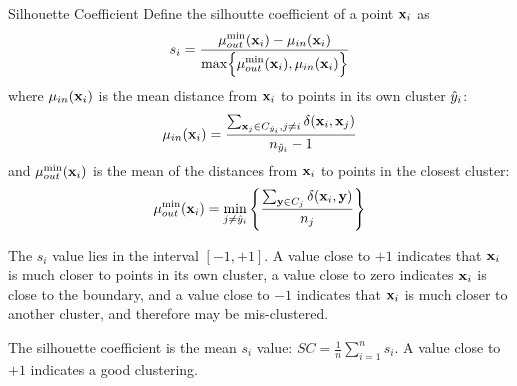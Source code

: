 \begin{frame}{Silhouette Coefficient}
  \small
Define the
silhoutte coeff\/{i}cient of a point $\mathbf{x}_i$ as
\begin{align*}
  s_i = \frac{\displaystyle \mu_{out}^{\min}(\mathbf{x}_i)-\mu_{in}(\mathbf{x}_i)}
  {\displaystyle \max
  \Bigl\{\mu_{out}^{\min}(\mathbf{x}_i), \mu_{in}(\mathbf{x}_i)\Bigr\} }
\end{align*}
where
$\mu_{in}(\mathbf{x}_i)$ is the mean distance from $\mathbf{x}_i$ to points in its own cluster $\hat{y}_i$:
\begin{align*}
  \mu_{in}(\mathbf{x}_i) = \frac{\sum_{\mathbf{x}_{j} \in C_{\hat{y}_i}, j \ne i}
  \delta(\mathbf{x}_i,\mathbf{x}_{j})}{n_{\hat{y}_i}-1}
\end{align*}
and $\mu_{out}^{\min}(\mathbf{x}_i)$ is the mean of the distances from
$\mathbf{x}_i$ to points in the closest cluster:
\begin{align*}
  \mu_{out}^{\min}(\mathbf{x}_i) = \min_{j\ne \hat{y}_i} \left\{
  \frac{\sum_{\mathbf{y} \in C_{j}} \delta(\mathbf{x}_i,\mathbf{y})}{n_{j}}
  \right\}
\end{align*}

\medskip
The $s_i$ value lies in the interval $[-1, +1]$. A value
close to
$+1$ indicates that $\mathbf{x}_i$ is much closer to points in its own
cluster, a value close to zero indicates $\mathbf{x}_i$ is
close to the boundary, and a value close to $-1$
indicates that $\mathbf{x}_i$ is much closer to another cluster, 
and therefore
may be mis-clustered.

\medskip
The silhouette coeff\/{i}cient is the mean $s_i$ value:
  $SC = \frac{1}{n} \sum_{i=1}^n s_i$.
A value close to $+1$ indicates a good clustering.
\end{frame}


